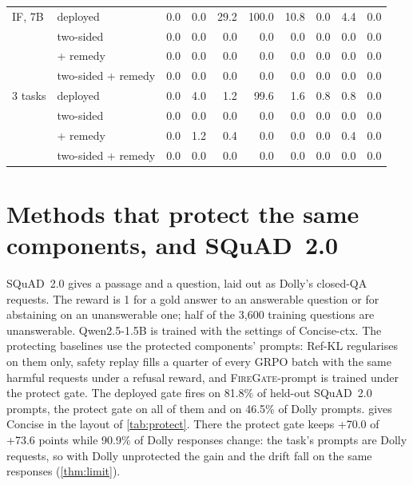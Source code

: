 \documentclass{article}
\theoremstyle{plain}
\theoremstyle{definition}
\theoremstyle{remark}
\newcommand{\methodp}{\textsc{FireGate}-prompt}
\begin{document}
\begin{table}[t]
\begin{tabular}{l l rrrrrrrr}
\midrule
IF, 7B & deployed & 0.0 & 0.0 & 29.2 & 100.0 & 10.8 & 0.0 & 4.4 & 0.0 \\
 & two-sided & 0.0 & 0.0 & 0.0 & 0.0 & 0.0 & 0.0 & 0.0 & 0.0 \\
 & + remedy & 0.0 & 0.0 & 0.0 & 0.0 & 0.0 & 0.0 & 0.0 & 0.0 \\
 & two-sided + remedy & 0.0 & 0.0 & 0.0 & 0.0 & 0.0 & 0.0 & 0.0 & 0.0 \\
\midrule
3 tasks & deployed & 0.0 & 4.0 & 1.2 & 99.6 & 1.6 & 0.8 & 0.8 & 0.0 \\
 & two-sided & 0.0 & 0.0 & 0.0 & 0.0 & 0.0 & 0.0 & 0.0 & 0.0 \\
 & + remedy & 0.0 & 1.2 & 0.4 & 0.0 & 0.0 & 0.0 & 0.4 & 0.0 \\
 & two-sided + remedy & 0.0 & 0.0 & 0.0 & 0.0 & 0.0 & 0.0 & 0.0 & 0.0 \\
\bottomrule
\end{tabular}
\end{table}


\section{Methods that protect the same components, and SQuAD~2.0}
\label{app:protect}

SQuAD~2.0 \citep{rajpurkar2018squad2} gives a passage and a question, laid out as Dolly's closed-QA requests. The
reward is 1 for a gold answer to an answerable question or for abstaining on an unanswerable one; half of the
3{,}600 training questions are unanswerable. Qwen2.5-1.5B is trained with the settings of Concise-ctx. The protecting
baselines use the protected components' prompts: Ref-KL regularises on them only, safety replay fills a quarter of
every GRPO batch with the same harmful requests under a refusal reward, and \methodp{} is trained under the protect
gate. The deployed gate fires on 81.8\% of
held-out SQuAD~2.0 prompts, the protect gate on all of them and on 46.5\% of Dolly prompts.  gives Concise in the layout of \cref{tab:protect}. There the protect gate keeps +70.0
of +73.6 points while 90.9\% of Dolly responses change: the task's prompts are Dolly requests, so with Dolly
unprotected the gain and the drift fall on the same responses (\cref{thm:limit}).
\end{document}
